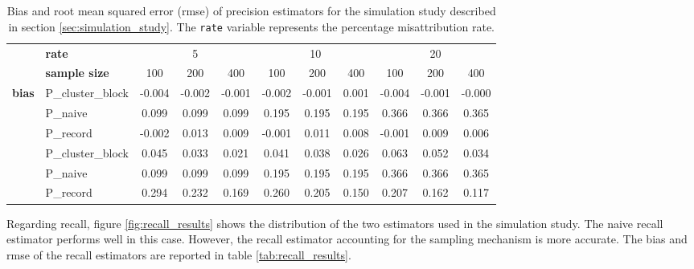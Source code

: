 \documentclass[fontsize=11pt]{article}
\theoremstyle{definition}
\begin{document}
\begin{table}\label{tab:precision_results}
    \centering
    \caption{\centering Bias and root mean squared error (rmse) of precision estimators for the simulation study described in section \ref{sec:simulation_study}. The \texttt{rate} variable represents the percentage misattribution rate.}
\begin{tabular}{llccccccccc}
\toprule
{} & \hfill{\textbf{rate}} & \multicolumn{3}{c}{5} & \multicolumn{3}{c}{10} & \multicolumn{3}{c}{20} \\
\cmidrule(lr){3-5}\cmidrule(lr){6-8}\cmidrule(lr){9-11}
{} & \hfill{\textbf{sample size}} & {100} & {200} & {400} & {100} & {200} & {400} & {100} & {200} & {400} \\
\midrule
\multirow[c]{4}{*}{\textbf{bias}} & P\_cluster\_block & -0.004 & -0.002 & -0.001 & -0.002 & -0.001 & 0.001 & -0.004 & -0.001 & -0.000 \\
 & P\_naive & 0.099 & 0.099 & 0.099 & 0.195 & 0.195 & 0.195 & 0.366 & 0.366 & 0.365 \\
 & P\_record & -0.002 & 0.013 & 0.009 & -0.001 & 0.011 & 0.008 & -0.001 & 0.009 & 0.006 \\
\midrule
\multirow[c]{4}{*}{\textbf{rmse}} & P\_cluster\_block & 0.045 & 0.033 & 0.021 & 0.041 & 0.038 & 0.026 & 0.063 & 0.052 & 0.034 \\
 & P\_naive & 0.099 & 0.099 & 0.099 & 0.195 & 0.195 & 0.195 & 0.366 & 0.366 & 0.365 \\
 & P\_record & 0.294 & 0.232 & 0.169 & 0.260 & 0.205 & 0.150 & 0.207 & 0.162 & 0.117 \\
\bottomrule
\end{tabular}
\end{table}

Regarding recall, figure \ref{fig:recall_results} shows the distribution of the two estimators used in the simulation study. The naive recall estimator performs well in this case. However, the recall estimator accounting for the sampling mechanism is more accurate. The bias and rmse of the recall estimators are reported in table \ref{tab:recall_results}.
\end{document}
